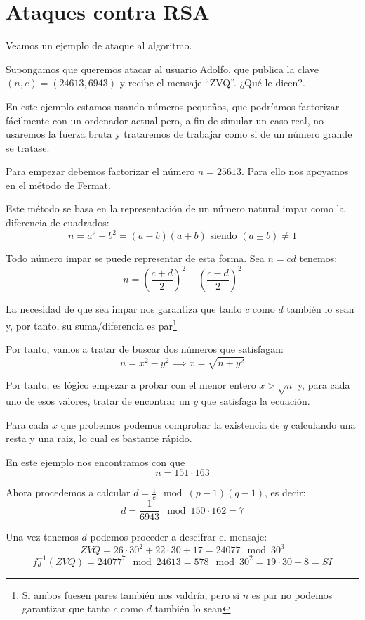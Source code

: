\section{Ataques contra RSA}
Veamos un ejemplo de ataque al algoritmo.
\begin{example}
Supongamos que queremos atacar al usuario Adolfo, que publica la clave $(n,e) = (24613,6943)$ y recibe el mensaje ``ZVQ''. ¿Qué le dicen?.

\obs En este ejemplo estamos usando números pequeños, que podríamos factorizar fácilmente con un ordenador actual pero, a fin de simular un caso real, no usaremos la fuerza bruta y trataremos de trabajar como si de un número grande se tratase.

Para empezar debemos factorizar el número $n=25613$. Para ello nos apoyamos en el método de Fermat.

\begin{defn}
Este método se basa en la representación de un número natural impar como la diferencia de cuadrados:
\[n = a^2-b^2 = (a-b)(a+b) \text{ siendo } (a\pm b) \neq 1\]

\obs Todo número impar se puede representar de esta forma. Sea $n=cd$ tenemos:
\[n = \left( \frac{c+d}{2}\right)^2 - \left( \frac{c-d}{2}\right)^2\]

La necesidad de que sea impar nos garantiza que tanto $c$ como $d$ también lo sean y, por tanto, su suma/diferencia es par\footnote{Si ambos fuesen pares también nos valdría, pero si $n$ es par no podemos garantizar que tanto $c$ como $d$ también lo sean}
\end{defn}

Por tanto, vamos a tratar de buscar dos números que satisfagan:
\[n=x^2-y^2 \implies x = \sqrt{n+y^2}\]

Por tanto, es lógico empezar a probar con el menor entero $x>\sqrt{n}$ y, para cada uno de esos valores, tratar de encontrar un $y$ que satisfaga la ecuación.

Para cada $x$ que probemos podemos comprobar la existencia de $y$ calculando una resta y una raiz, lo cual es bastante rápido. 

En este ejemplo nos encontramos con que
\[n = 151 \cdot 163\]

Ahora procedemos a calcular $d=\frac{1}{e} \mod (p-1)(q-1)$, es decir:
\[d = \frac{1}{6943} \mod 150 \cdot 162 = 7 \]

Una vez tenemos $d$ podemos proceder a descifrar el mensaje:
\[ZVQ = 26 \cdot 30^2+22 \cdot 30 +17 = 24077 \mod 30^3\]
\[f_d^{-1}(ZVQ) = 24077^7 \mod 24613 = 578 \mod 30^2 = 19\cdot 30 +8 = SI\]
\end{example}

